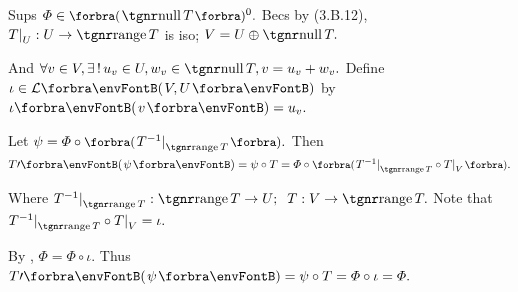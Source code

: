 {\par\quad
Sups $\varPhi\in\BigPar{\null T}{^0}.$ Becs by (3.B.12), $T\mmid_U:U\rightarrow\range T$ is iso; $V=U\oplus\null T.$\par\quad
And $\forall v\in V,\exists\,!\,u_v\in U,w_v\in\null T,v=u_v+w_v.$ Define $\iota\in\Lm{V,U}$ by $\iota\Par{v}=u_v.$\vspace{4pt}\par\quad
Let $\psi=\varPhi\circ\BigPar{T^{-1}\mmid_{\range T}}.$ Then $T\apostrophe\Par{\psi}=\psi\circ T=\varPhi\circ\BigPar{T^{-1}\mmid_{\range T}\circ T\mmid_V}.$\vspace{2pt}\par\quad
Where $T^{-1}\mmid_{\range T}:\range T\rightarrow U;\;\;T:V\rightarrow\range T.$ Note that $T^{-1}\mmid_{\range T}\circ T\mmid_V=\iota.$\vspace{2pt}\par\quad
By , $\varPhi=\varPhi\circ \iota.$ Thus $T\apostrophe\Par{\psi}=\psi\circ T=\varPhi\circ{\iota}=\varPhi.$\PfEnd
\SepLine
}


